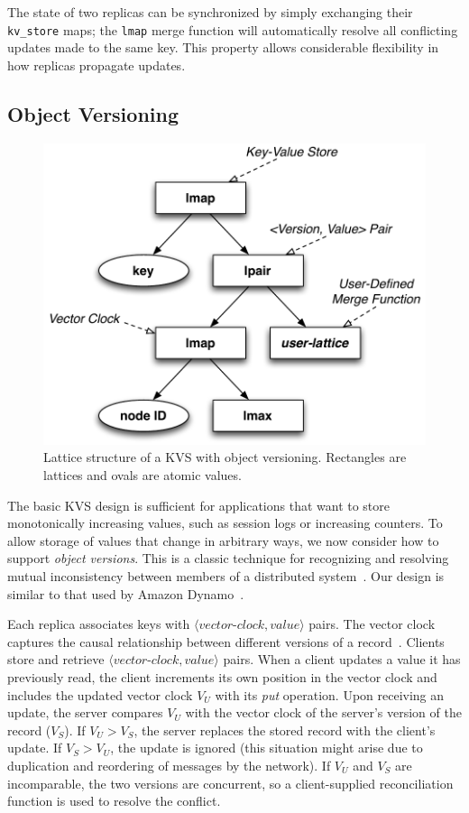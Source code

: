 The state of two replicas can be synchronized by simply exchanging their
\texttt{kv\_store} maps; the \texttt{lmap} merge function will automatically
resolve all conflicting updates made to the same key. This property allows
considerable flexibility in how replicas propagate updates.

\subsection{Object Versioning}
\label{sec:kvs-versions}
\begin{figure}[t]
\centering
\includegraphics[width=0.8\linewidth]{fig/kvs-vc-lattice.pdf}
\caption{Lattice structure of a KVS with object versioning. Rectangles are
  lattices and ovals are atomic values.}
\label{fig:kvs-vc-lattices}
\end{figure}

The basic KVS design is sufficient for applications that want to store
monotonically increasing values, such as session logs or increasing counters. To
allow storage of values that change in arbitrary ways, we now consider how to
support \emph{object versions}. This is a classic technique for recognizing and resolving
mutual inconsistency between members of a distributed system~\cite{Parker1983}.
Our design is similar to that used by Amazon Dynamo~\cite{DeCandia2007}.

Each replica associates keys with
$\langle\textit{vector-clock},\textit{value}\rangle$ pairs. The vector clock
captures the causal relationship between different versions of a
record~\cite{Fidge1988,Mattern1989}. Clients store and retrieve
$\langle\textit{vector-clock},\textit{value}\rangle$ pairs. When a client
updates a value it has previously read, the client increments its own position
in the vector clock and includes the updated vector clock $V_U$ with its
\emph{put} operation. Upon receiving an update, the server compares $V_U$ with
the vector clock of the server's version of the record ($V_S$). If $V_U > V_S$,
the server replaces the stored record with the client's update. If $V_S > V_U$,
the update is ignored (this situation might arise due to duplication and
reordering of messages by the network). If $V_U$ and $V_S$ are incomparable, the
two versions are concurrent, so a client-supplied reconciliation function is
used to resolve the conflict.

